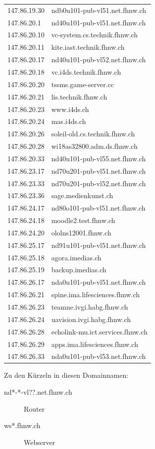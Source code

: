 \documentclass[a4paper,11pt]{scrartcl}
\begin{document}
\begin{longtable}{p{2.5cm}|p{7cm}}
	147.86.19.30 & ndb0u101-pub-vl51.net.fhnw.ch \\ 
	147.86.20.1 & nd40u101-pub-vl51.net.fhnw.ch \\ 
	147.86.20.10 & vc-system.cs.technik.fhnw.ch \\ 
	147.86.20.11 & kite.iast.technik.fhnw.ch \\ 
	147.86.20.17 & nd40u101-pub-vl52.net.fhnw.ch \\ 
	147.86.20.18 & vc.i4ds.technik.fhnw.ch \\ 
	147.86.20.20 & tssms.game-server.cc \\ 
	147.86.20.21 & lis.technik.fhnw.ch \\ 
	147.86.20.23 & www.i4ds.ch \\ 
	147.86.20.24 & mas.i4ds.ch \\ 
	147.86.20.26 & soleil-old.cs.technik.fhnw.ch \\ 
	147.86.20.28 & wi18as32800.adm.ds.fhnw.ch \\ 
	147.86.20.33 & nd40u101-pub-vl55.net.fhnw.ch \\ 
	147.86.23.17 & nd70u201-pub-vl51.net.fhnw.ch \\ 
	147.86.23.33 & nd70u201-pub-vl52.net.fhnw.ch \\ 
	147.86.23.36 & sage.medienkunst.ch \\ 
	147.86.24.17 & nd80o101-pub-vl51.net.fhnw.ch \\ 
	147.86.24.18 & moodle2.test.fhnw.ch \\ 
	147.86.24.20 & ololns12001.fhnw.ch \\ 
	147.86.25.17 & nd91u101-pub-vl51.net.fhnw.ch \\ 
	147.86.25.18 & agora.imedias.ch \\ 
	147.86.25.19 & backup.imedias.ch \\ 
	147.86.26.17 & nda0u101-pub-vl51.net.fhnw.ch \\ 
	147.86.26.21 & spine.ima.lifesciences.fhnw.ch \\ 
	147.86.26.23 & teamne.ivgi.habg.fhnw.ch \\ 
	147.86.26.24 & uavision.ivgi.habg.fhnw.ch \\ 
	147.86.26.28 & echolink-mu.ict.services.fhnw.ch \\ 
	147.86.26.29 & apps.ima.lifesciences.fhnw.ch \\ 
	147.86.26.33 & nda0u101-pub-vl53.net.fhnw.ch \\ 
\end{longtable}

Zu den Kürzeln in diesen Domainnamen:
\begin{description}
	\item[nd*-*-vl??.net.fhnw.ch] Router
	\item[ws*.fhnw.ch] Webserver
\end{description}
\end{document}
